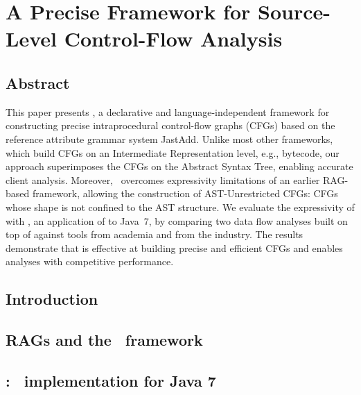 

\chapter[A Precise Framework for Source-Level Control-Flow Analysis]{\texorpdfstring{%
A Precise Framework for Source-Level Control-Flow Analysis}{%
A Precise Framework for Source-Level Control-Flow Analysis}}

\paperRemark{\paperIref}





\section{Abstract}
This paper presents \intracfg, a declarative and language-independent framework for constructing precise intraprocedural control-flow graphs (CFGs) based on the reference attribute grammar system JastAdd. Unlike most other frameworks, which build CFGs on an Intermediate Representation level, e.g., bytecode,  our approach superimposes the CFGs on the Abstract Syntax Tree, enabling accurate client analysis.
Moreover, \intracfg\ overcomes expressivity limitations of an earlier RAG-based framework, allowing the construction of AST-Unrestricted CFGs: CFGs whose shape is not confined to the AST structure.
We evaluate the expressivity of {\intracfg} with {\intraj}, an application of {\intracfg} to Java~7,
by comparing two data flow analyses built on top of {\intraj} against tools from academia and from the industry.
The results demonstrate that {\intraj} is effective at building precise and efficient CFGs and enables analyses with competitive performance.




\section{Introduction}
\label{sec:introduction}



\section{RAGs and the \intracfg\ framework}
\label{sec:framework}



\section{\intraj: \intracfg\  implementation for Java 7}
\label{sec:implementation}


